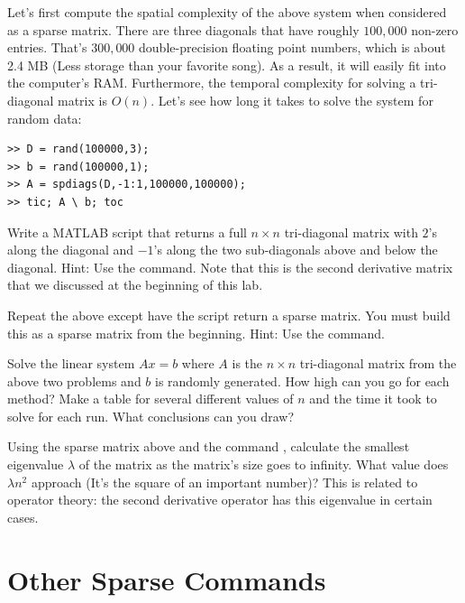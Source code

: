 Let's first compute the spatial complexity of the above system when
considered as a sparse matrix.  There are three diagonals that have
roughly $100,\!000$ non-zero entries.  That's $300,\!000$
double-precision floating point numbers, which is about 2.4 MB (Less
storage than your favorite song).  As a result, it will easily
fit into the computer's RAM.  Furthermore, the temporal complexity for solving
a tri-diagonal matrix is $O(n)$. Let's see how long it takes to
solve the system for random data:

\begin{lstlisting}[style=matlab]
>> D = rand(100000,3);
>> b = rand(100000,1);
>> A = spdiags(D,-1:1,100000,100000);
>> tic; A \ b; toc
\end{lstlisting}

\begin{problem}
Write a MATLAB script that returns a full $n\times n$
tri-diagonal matrix with $2$'s along the diagonal and $-1$'s along
the two sub-diagonals above and below the diagonal. Hint: Use the  command. Note that this is the second derivative matrix that we discussed at the beginning of this lab.
\end{problem}

\begin{problem}
Repeat the above except have the script return a sparse
matrix. You must build this as a sparse matrix from the beginning. Hint: Use the  command.
\end{problem}

\begin{problem}
Solve the linear system $A x = b$ where $A$ is the $n\times n$
tri-diagonal matrix from the above two problems and $b$ is randomly
generated.  How high can you go for each method?  Make a table for
several different values of $n$ and the time it took to solve for
each run.  What conclusions can you draw?
\end{problem}

\begin{problem}
Using the sparse matrix above and the command , calculate the smallest eigenvalue $\lambda$ of the matrix as the matrix's size goes to infinity. What value does $\lambda n^2$ approach (It's the square of an important number)? This is related to operator theory: the second derivative operator has this eigenvalue in certain cases.
\end{problem}

\section*{Other Sparse Commands}

